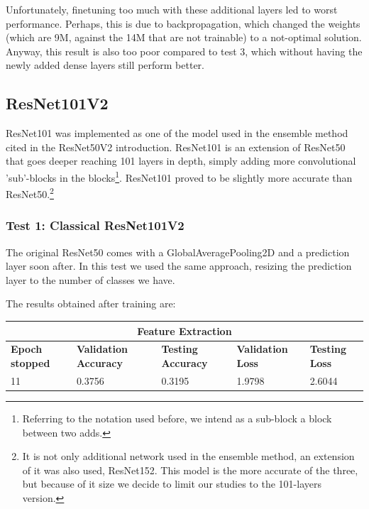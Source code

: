 Unfortunately, finetuning too much with these additional layers led to worst performance. Perhaps, this is due to backpropagation, which changed the weights (which are 9M, against the 14M that are not trainable) to a not-optimal solution. Anyway, this result is also too poor compared to test 3, which without having the newly added dense layers still perform better.







\subsection{ResNet101V2}
ResNet101 was implemented as one of the model used in the ensemble method cited in the ResNet50V2 introduction. ResNet101 is an extension of ResNet50 that goes deeper reaching 101 layers in depth, simply adding more convolutional 'sub'-blocks in the blocks\footnote{Referring to the notation used before, we intend as a sub-block a block between two adds.}. ResNet101 proved to be slightly more accurate than ResNet50.\footnote{It is not only additional network used in the ensemble method, an extension of it was also used, ResNet152. This model is the more accurate of the three, but because of it size we decide to limit our studies to the 101-layers version.}

\subsubsection{Test 1: Classical ResNet101V2}
The original ResNet50 comes with a GlobalAveragePooling2D and a prediction layer soon after. In this test we used the same approach, resizing the prediction layer to the number of classes we have.

\noindent The results obtained after training are:

\medskip

\begin{tabular}{ |p{2cm}|p{2cm}|p{2cm}|p{2cm}|p{2cm}|  }
\hline
\multicolumn{5}{|c|}{Feature Extraction} \\
\hline
\textbf{Epoch stopped} & \textbf{Validation Accuracy} & \textbf{Testing Accuracy} & \textbf{Validation Loss} & \textbf{Testing Loss} \\
\hline
11 & 0.3756 & 0.3195 & 1.9798 & 2.6044\\
\hline
\end{tabular}

